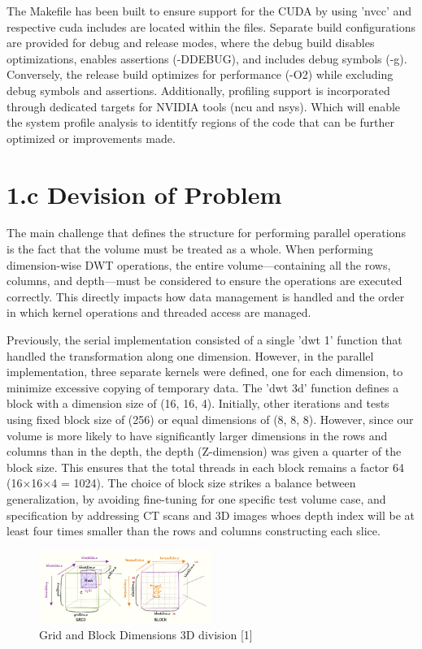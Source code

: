 \documentclass[journal,11pt]{IEEEtran}
\begin{document}
The Makefile has been built to ensure support for the CUDA by using 'nvcc' and respective cuda includes are located within the files. Separate build configurations are provided for debug and release modes, where the debug build disables optimizations, enables assertions (-DDEBUG), and includes debug symbols (-g). Conversely, the release build optimizes for performance (-O2) while excluding debug symbols and assertions. Additionally, profiling support is incorporated through dedicated targets for NVIDIA tools (ncu and nsys). Which will enable the system profile analysis to identitfy regions of the code that can be further optimized or improvements made.

\section{1.c Devision of Problem}

The main challenge that defines the structure for performing parallel operations is the fact that the volume must be treated as a whole. When performing dimension-wise DWT operations, the entire volume—containing all the rows, columns, and depth—must be considered to ensure the operations are executed correctly. This directly impacts how data management is handled and the order in which kernel operations and threaded access are managed.

Previously, the serial implementation consisted of a single 'dwt 1' function that handled the transformation along one dimension. However, in the parallel implementation, three separate kernels were defined, one for each dimension, to minimize excessive copying of temporary data. The 'dwt 3d' function defines a block with a dimension size of (16, 16, 4). Initially, other iterations and tests using fixed block size of (256) or equal dimensions of (8, 8, 8). However, since our volume is more likely to have significantly larger dimensions in the rows and columns than in the depth, the depth (Z-dimension) was given a quarter of the block size. This ensures that the total threads in each block remains a factor 64 (16×16×4 = 1024). The choice of block size strikes a balance between generalization, by avoiding fine-tuning for one specific test volume case, and specification by addressing CT scans and 3D images whoes depth index will be at least four times smaller than the rows and columns constructing each slice.

\begin{figure}[h]
    \centering
    \includegraphics[width=0.5\textwidth]{assets/grid_block.png}
    \caption{Grid and Block Dimensions 3D division [1]}
    \label{fig:1}
\end{figure}
\end{document}
